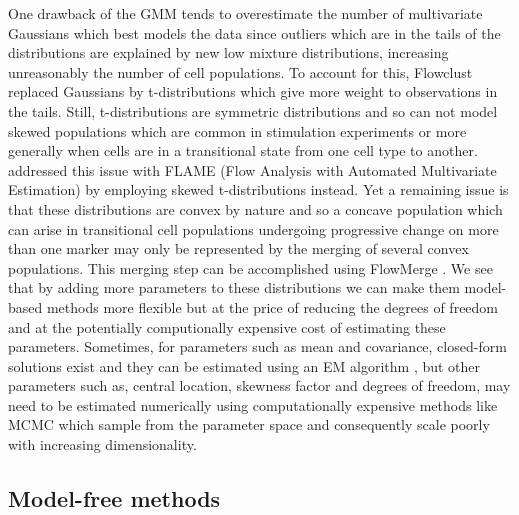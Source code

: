 One drawback of the \gls{GMM} tends to overestimate the number of multivariate Gaussians which best models the data since outliers which are in the tails of the distributions
are explained by new low mixture distributions, increasing unreasonably the number of cell populations.
To account for this, Flowclust \citep{Lo:2008it} replaced Gaussians by
t-distributions which give more weight to observations in the tails.
Still, t-distributions are symmetric distributions and so can not model skewed populations which are common in stimulation experiments or more generally when cells are in a transitional state from one cell type to another.
\citet{Pyne:2009hl} addressed this issue with FLAME (Flow Analysis with Automated Multivariate Estimation) by employing skewed t-distributions instead.
Yet a remaining issue is that these distributions are convex by nature and so a concave population which can arise in transitional cell populations undergoing progressive change on more than one marker may only be represented by the merging of several convex populations.
This merging step can be accomplished using FlowMerge \citep{Finak:2009fk}.
We see that by adding more parameters to these distributions we can make them model-based methods more flexible but at the price of reducing the degrees of
freedom and at the potentially computionally expensive cost of estimating these parameters.
Sometimes, for parameters such as mean and covariance, closed-form solutions exist and they can be estimated using an \gls{EM} algorithm \citep{Dempster:1977ul},
but other parameters such as, central location, skewness factor and degrees of freedom,
may need to be estimated numerically using computationally expensive methods like \gls{MCMC} which sample from the parameter space
and consequently scale poorly with increasing dimensionality.

\subsection{Model-free methods}


